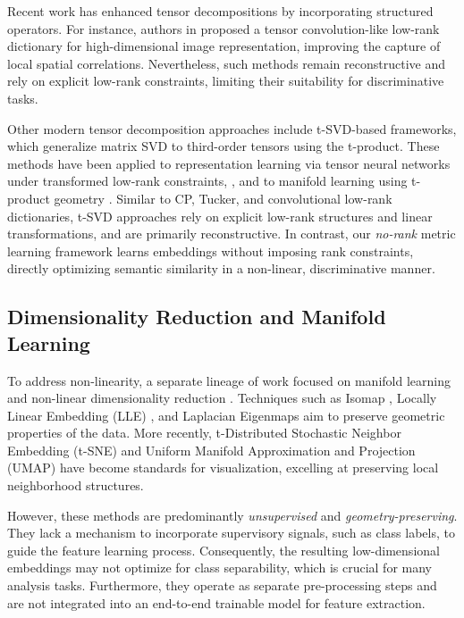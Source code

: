 \documentclass[a4paper,12pt,reqno]{amsart}
\theoremstyle{definition}
\theoremstyle{remark}
\begin{document}
Recent work has enhanced tensor decompositions by incorporating structured operators. For instance, authors in \cite{xue2024tensor} proposed a tensor convolution-like low-rank dictionary for high-dimensional image representation, improving the capture of local spatial correlations. Nevertheless, such methods remain reconstructive and rely on explicit low-rank constraints, limiting their suitability for discriminative tasks.
	
Other modern tensor decomposition approaches include t-SVD-based frameworks, which generalize matrix SVD to third-order tensors using the t-product. These methods have been applied to representation learning via tensor neural networks under transformed low-rank constraints, \cite{wang2023transformed}, and to manifold learning using t-product geometry \cite{wangtowards}. Similar to CP, Tucker, and convolutional low-rank dictionaries, t-SVD approaches rely on explicit low-rank structures and linear transformations, and are primarily reconstructive. In contrast, our \textit{no-rank} metric learning framework learns embeddings without imposing rank constraints, directly optimizing semantic similarity in a non-linear, discriminative manner.



\subsection*{Dimensionality Reduction and Manifold Learning}

To address non-linearity, a separate lineage of work focused on manifold learning and non-linear dimensionality reduction \cite{bagherian2023classical}. Techniques such as Isomap \cite{tenenbaum2000global}, Locally Linear Embedding (LLE) \cite{roweis2000nonlinear}, and Laplacian Eigenmaps \cite{belkin2003laplacian} aim to preserve geometric properties of the data. More recently, t-Distributed Stochastic Neighbor Embedding (t-SNE) \cite{maaten2008visualizing} and Uniform Manifold Approximation and Projection (UMAP) \cite{mcinnes2018umap} have become standards for visualization, excelling at preserving local neighborhood structures.

However, these methods are predominantly \textit{unsupervised} and \textit{geometry-preserving}. They lack a mechanism to incorporate supervisory signals, such as class labels, to guide the feature learning process. Consequently, the resulting low-dimensional embeddings may not optimize for class separability, which is crucial for many analysis tasks. Furthermore, they operate as separate pre-processing steps and are not integrated into an end-to-end trainable model for feature extraction.
\end{document}
